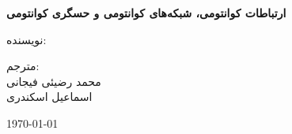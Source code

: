 \documentclass[12pt,a4paper]{book}
\begin{document}
	
	\begin{titlepage}
		\centering
		
		\vspace*{2cm}
		
		{\Huge \textbf{ارتباطات کوانتومی،
				شبکه‌های کوانتومی و
				حسگری کوانتومی}
		}\\[0.8cm]
		
		{
			\Large {}
		}
		
		\vspace{2cm}
		
		{\large نویسنده:}\\[0.5cm]
		
		
		\vfill
		
		{\large مترجم:}\\[0.5cm]
		محمد رضیئی فیجانی\\
اسماعیل اسکندری
		
		\vspace{1cm}
		
		{\large \today}
		
	\end{titlepage}
	
	\twocolumnfootnotes	
	
		
	\tableofcontents
	\newpage
	
	

	
	
	
	\chapter{}\chapter{}\chapter{}
	
	
%	
	
	
	


	
\end{document}
